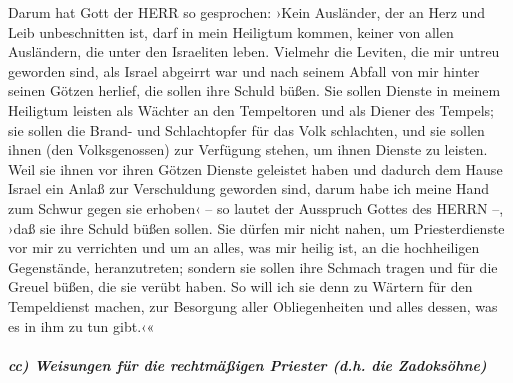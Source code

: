 Darum hat Gott der HERR so gesprochen: ›Kein Ausländer,
der an Herz und Leib unbeschnitten ist, darf in mein Heiligtum kommen,
keiner von allen Ausländern, die unter den Israeliten leben.
Vielmehr die Leviten, die mir untreu geworden sind, als
Israel abgeirrt war und nach seinem Abfall von mir hinter seinen Götzen
herlief, die sollen ihre Schuld büßen. Sie sollen Dienste
in meinem Heiligtum leisten als Wächter an den Tempeltoren und als
Diener des Tempels; sie sollen die Brand- und Schlachtopfer für das Volk
schlachten, und sie sollen ihnen (den Volksgenossen) zur Verfügung
stehen, um ihnen Dienste zu leisten. Weil sie ihnen vor
ihren Götzen Dienste geleistet haben und dadurch dem Hause Israel ein
Anlaß zur Verschuldung geworden sind, darum habe ich meine Hand zum
Schwur gegen sie erhoben‹ -- so lautet der Ausspruch Gottes des HERRN
--, ›daß sie ihre Schuld büßen sollen. Sie dürfen mir
nicht nahen, um Priesterdienste vor mir zu verrichten und um an alles,
was mir heilig ist, an die hochheiligen Gegenstände, heranzutreten;
sondern sie sollen ihre Schmach tragen und für die Greuel büßen, die sie
verübt haben. So will ich sie denn zu Wärtern für den
Tempeldienst machen, zur Besorgung aller Obliegenheiten und alles
dessen, was es in ihm zu tun gibt.‹«

\hypertarget{cc-weisungen-fuxfcr-die-rechtmuxe4uxdfigen-priester-d.h.-die-zadoksuxf6hne}{%
\subparagraph{cc) Weisungen für die rechtmäßigen Priester (d.h. die
Zadoksöhne)}\label{cc-weisungen-fuxfcr-die-rechtmuxe4uxdfigen-priester-d.h.-die-zadoksuxf6hne}}

